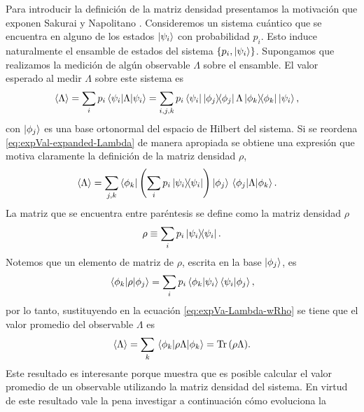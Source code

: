 Para introducir la definición de la matriz densidad presentamos la 
motivación que exponen Sakurai y Napolitano \cite{sakurai_napolitano_2017}.
Consideremos un sistema cuántico que se encuentra en alguno de los estados 
$\ket{\psi_{i} }$ con probabilidad $p_i$. Esto induce naturalmente el 
ensamble de estados del sistema $\{p_i, \ket{\psi_i} \}$. 
Supongamos que realizamos 
la medición de algún observable $\Lambda$ sobre el ensamble. El 
valor esperado al medir $\Lambda$ sobre este sistema es
\begin{align}\label{eq:expVal-expanded-Lambda}
	\expval{\Lambda} &= \sum_i p_i \matrixel{\psii}{\Lambda}{\psii}
	= \sum_{i,j,k} p_i 
	\bra{\psii}\dyad{\phi_j}{\phi_j}\Lambda\dyad{\phi_k}{\phi_k}\Pk{i},
\end{align}
con $\ket{\phi_j}$ es una base ortonormal del
espacio de Hilbert del sistema. Si se reordena
\eqref{eq:expVal-expanded-Lambda} de manera apropiada
se obtiene una expresión 
que motiva claramente la definición de la matriz densidad $\rho$,
\begin{align}\label{eq:expVa-Lambda-wRho}
	\expval{\Lambda}&= \sum _{j,k}\bra{\phi_k}\qty(\sum_ip_i \dyad{\psii}{\psii} 
	)\ket{\phi_j}	\matrixel{\phi_j}{\Lambda}{\phi_k}.
\end{align}
La matriz que se encuentra entre paréntesis se define como 
la matriz densidad 
$\rho$~\cite{nielsen_chuang_2011, sakurai_napolitano_2017}
\begin{equation}\label{eq:rho_def}
	\rho \equiv \sum _i p_i\dyad{\psi_i}{\psi_i}.
\end{equation}
Notemos que un elemento de matriz de $\rho$, escrita en la base 
$\ket{\phi_j}$, es
\begin{align}
	\matrixel{\phi_k}{\rho}{\phi_j} = 
	\sum_ip_i \braket{\phi_k}{\psii}\braket{\psii}{\phi_j},
\end{align}
por lo tanto, sustituyendo en la ecuación \eqref{eq:expVa-Lambda-wRho}
se tiene que el valor promedio del observable $\Lambda$ es
\begin{align}\label{eq:Tr(rhoLambda)}
	\expval{\Lambda}=\sum _k \matrixel{\phi_k}{\rho \Lambda}{\phi_k} 
	= \Tr \qty(\rho\Lambda).
\end{align} 
Este resultado es interesante porque muestra que es posible 
calcular el valor promedio de un observable utilizando la 
matriz densidad del sistema. En virtud de este resultado
vale la pena investigar a continuación cómo evoluciona la 
